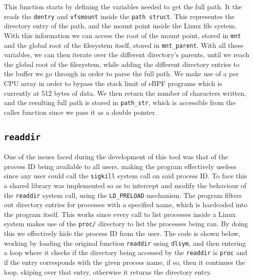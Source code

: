 \bigbreak

This function starts by defining the variables needed to get the full path.
It the reads the \texttt{dentry} and \texttt{vfsmount} inside the \texttt{path struct}.
This representes the directory entry of the path, and the mount point inside the Linux file system.
With this information we can access the root of the mount point, stored in \texttt{mnt} and the global root of the filesystem itself, stored in \texttt{mnt\_parent}.
With all these variables, we can then iterate over the different directory's parents, until we reach the global root of the filesystem, while adding the different directory entries to the buffer we go through in order to parse the full path.
We make use of a per CPU array in order to bypass the stack limit of eBPF programs which is currently at 512 bytes of data.
We then return the number of characters written, and the resulting full path is stored in \texttt{path\_str}, which is accessible from the caller function since we pass it as a double pointer.



\subsection{\texttt{readdir}}
One of the issues faced during the development of this tool was that of the process ID being available to all users, making the program effectively useless since any user could call the \texttt{sigkill} system call on said process ID. To face this a shared library was implemented so as to intercept and modify the behaviour of the \texttt{readdir} system call, using the \texttt{LD\_PRELOAD} mechanism. The program filters out directory entries for processes with a specified name, which is hardcoded into the program itself. This works since every call to list processes inside a Linux system makes use of the \texttt{proc/} directory to list the processes being ran. By doing this we effectively hide the process ID from the user. The code is shown below, working by loading the original function \texttt{readdir} using \texttt{dlsym}, and then entering a loop where it checks if the directory being accessed by the \texttt{readdir} is \texttt{proc} and if the entry corresponds with the given process name, if so, then it continues the loop, skiping over that entry, otherwise it returns the directory entry.

